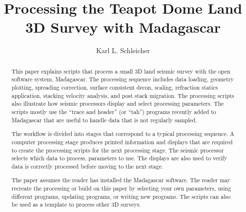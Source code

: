 
\title{Processing the Teapot Dome Land 3D Survey with Madagascar}               %
\author{Karl L. Schleicher}

\address{
k\_schleicher@hotmail.com \\
Texas Consortium for Computation Seismology \\
John A. and Katherine G. Jackson School of Geosciences \\
The University of Texas at Austin \\
University Station, Box X \\
Austin, TX 78713-8924}

\maketitle

\begin{abstract}
This paper explains scripts that process a small 3D land seismic survey with 
the open software system, Madagascar.  The processing sequence includes data 
loading, geometry plotting, spreading correction, surface consistent decon, 
scaling, refraction statics application, stacking velocity analysis, and post 
stack migration.  The processing scripts also illustrate how seismic processors
display and select processing parameters.  The scripts mostly use the “trace 
and header” (or “tah”) programs recently added to Madagascar that are useful
to handle data that is not regularly sampled. 

The workflow is divided into stages that correspond to a typical processing 
sequence.  A computer processing stage produces printed information and 
displays that are required to create the processing scripts for the next 
processing stage.  The seismic processor selects which data to process, 
parameters to use.  The displays are also used to verify data is correctly 
processed before moving to the next stage.

The paper assumes the reader has installed the Madagascar software.  The 
reader may recreate the processing or build on this paper by selecting your 
own parameters, using different programs, updating programs, or writing new 
programs.  The scripts can also be used as a template to process other 3D 
surveys.
\end{abstract}

